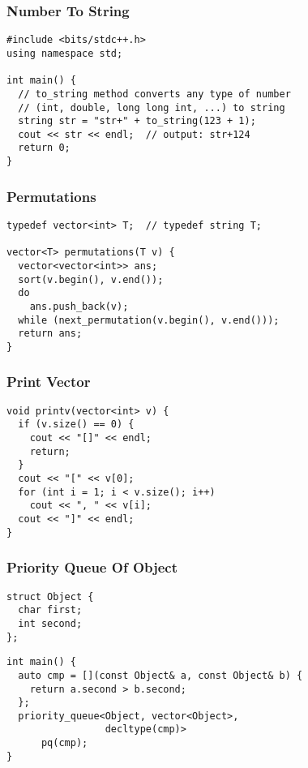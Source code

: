\documentclass[twoside]{article}
\begin{document}
\begin{multicols*}{2}
\subsubsectionfont{\large\bfseries\sffamily\underline}
\subsubsection*{Number To String}
\begin{verbatim}
#include <bits/stdc++.h>
using namespace std;

int main() {
  // to_string method converts any type of number
  // (int, double, long long int, ...) to string
  string str = "str+" + to_string(123 + 1);
  cout << str << endl;  // output: str+124
  return 0;
}
\end{verbatim}

\subsubsectionfont{\large\bfseries\sffamily\underline}
\subsubsection*{Permutations}
\begin{verbatim}
typedef vector<int> T;  // typedef string T;

vector<T> permutations(T v) {
  vector<vector<int>> ans;
  sort(v.begin(), v.end());
  do
    ans.push_back(v);
  while (next_permutation(v.begin(), v.end()));
  return ans;
}
\end{verbatim}

\subsubsectionfont{\large\bfseries\sffamily\underline}
\subsubsection*{Print Vector}
\begin{verbatim}
void printv(vector<int> v) {
  if (v.size() == 0) {
    cout << "[]" << endl;
    return;
  }
  cout << "[" << v[0];
  for (int i = 1; i < v.size(); i++)
    cout << ", " << v[i];
  cout << "]" << endl;
}
\end{verbatim}

\subsubsectionfont{\large\bfseries\sffamily\underline}
\subsubsection*{Priority Queue Of Object}
\begin{verbatim}
struct Object {
  char first;
  int second;
};
\end{verbatim}
\vspace{-12pt}
\begin{verbatim}
int main() {
  auto cmp = [](const Object& a, const Object& b) {
    return a.second > b.second;
  };
  priority_queue<Object, vector<Object>,
                 decltype(cmp)>
      pq(cmp);
}
\end{verbatim}


\end{multicols*}
\end{document}
